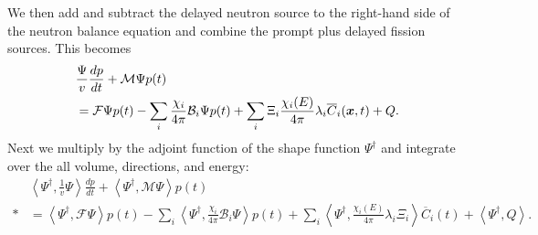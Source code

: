 We then add and subtract the delayed neutron source to the right-hand side of the neutron balance equation and combine the prompt plus delayed fission sources. This becomes
\begin{align}
  &\frac{\Psi}{v}\frac{dp}{dt}  +   \mathcal{M} \Psi p(t) \nonumber \\*
  &= \mathcal{F} \Psi  p(t) - \sum_i \frac{\chi_i}{4\pi} \mathcal{B}_i \Psi  p(t) + \sum_i \Xi_i \frac{\chi_i(E)}{4\pi} \lambda_i \overline{C}_i(\bm{x},t) + Q . \label{Eq:kinetics_pointKineticsDerivationAdjoint_NeutronBalance_step1}
\end{align}
Next we multiply by the adjoint function of the shape function $\Psi^\dagger$ and integrate over the all volume, directions, and energy:
\begin{align}
  &\left< \Psi^\dagger, \frac{1}{v} \Psi \right> \frac{dp}{dt}   +  \left< \Psi^\dagger, \mathcal{M} \Psi \right> p(t) \nonumber \\*
  &= \left< \Psi^\dagger, \mathcal{F} \Psi \right>  p(t) - \sum_i \left< \Psi^\dagger, \frac{\chi_i}{4\pi} \mathcal{B}_i \Psi \right>   p(t) + \sum_i \left< \Psi^\dagger, \frac{\chi_i(E)}{4\pi} \lambda_i \Xi_i \right> \overline{C}_i(t) + \left< \Psi^\dagger, Q \right>. \label{Eq:kinetics_pointKineticsDerivationAdjoint_NeutronBalance_step2}
\end{align}

